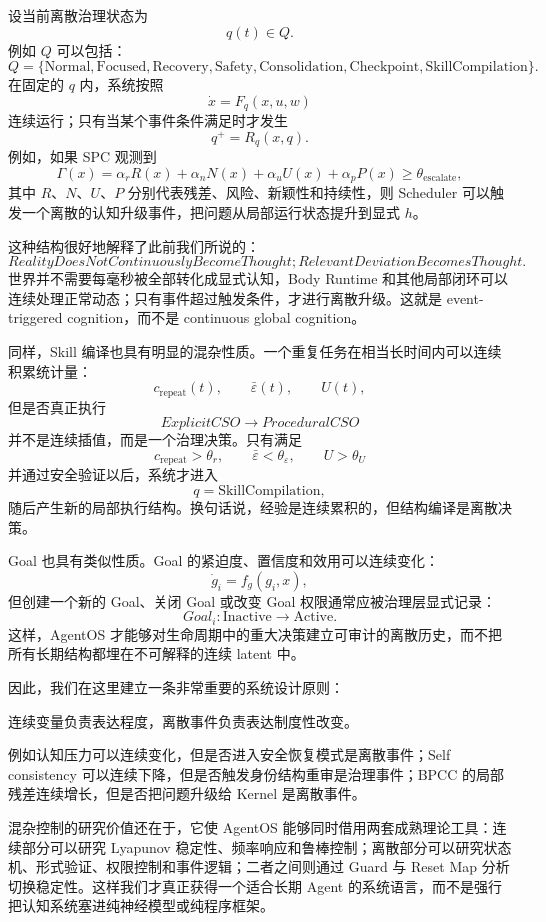 设当前离散治理状态为
\[
q(t)\in Q.
\]
例如 $Q$ 可以包括：
\[
Q=
\{
\text{Normal},
\text{Focused},
\text{Recovery},
\text{Safety},
\text{Consolidation},
\text{Checkpoint},
\text{SkillCompilation}
\}.
\]
在固定的 $q$ 内，系统按照
\[
\dot{x}
=
F_q(x,u,w)
\]
连续运行；只有当某个事件条件满足时才发生
\[
q^+
=
R_q(x,q).
\]
例如，如果 SPC 观测到
\[
\Gamma(x)
=
\alpha_rR(x)
+
\alpha_nN(x)
+
\alpha_uU(x)
+
\alpha_pP(x)
\geq
\theta_{\mathrm{escalate}},
\]
其中 $R$、$N$、$U$、$P$ 分别代表残差、风险、新颖性和持续性，则 Scheduler 可以触发一个离散的认知升级事件，把问题从局部运行状态提升到显式 $h$。

这种结构很好地解释了此前我们所说的：
\[
\boxed{
RealityDoesNotContinuouslyBecomeThought;
RelevantDeviationBecomesThought.
}
\]
世界并不需要每毫秒被全部转化成显式认知，Body Runtime 和其他局部闭环可以连续处理正常动态；只有事件超过触发条件，才进行离散升级。这就是 event-triggered cognition，而不是 continuous global cognition。

同样，Skill 编译也具有明显的混杂性质。一个重复任务在相当长时间内可以连续积累统计量：
\[
c_{\mathrm{repeat}}(t),
\qquad
\bar{\varepsilon}(t),
\qquad
U(t),
\]
但是否真正执行
\[
ExplicitCSO
\longrightarrow
ProceduralCSO
\]
并不是连续插值，而是一个治理决策。只有满足
\[
c_{\mathrm{repeat}}>\theta_r,
\qquad
\bar{\varepsilon}<\theta_\varepsilon,
\qquad
U>\theta_U
\]
并通过安全验证以后，系统才进入
\[
q=\text{SkillCompilation},
\]
随后产生新的局部执行结构。换句话说，经验是连续累积的，但结构编译是离散决策。

Goal 也具有类似性质。Goal 的紧迫度、置信度和效用可以连续变化：
\[
\dot g_i=f_g(g_i,x),
\]
但创建一个新的 Goal、关闭 Goal 或改变 Goal 权限通常应被治理层显式记录：
\[
Goal_i:\mathrm{Inactive}\rightarrow\mathrm{Active}.
\]
这样，AgentOS 才能够对生命周期中的重大决策建立可审计的离散历史，而不把所有长期结构都埋在不可解释的连续 latent 中。

因此，我们在这里建立一条非常重要的系统设计原则：
\begin{proposition*}
连续变量负责表达程度，离散事件负责表达制度性改变。
\end{proposition*}
例如认知压力可以连续变化，但是否进入安全恢复模式是离散事件；Self consistency 可以连续下降，但是否触发身份结构重审是治理事件；BPCC 的局部残差连续增长，但是否把问题升级给 Kernel 是离散事件。

混杂控制的研究价值还在于，它使 AgentOS 能够同时借用两套成熟理论工具：连续部分可以研究 Lyapunov 稳定性、频率响应和鲁棒控制；离散部分可以研究状态机、形式验证、权限控制和事件逻辑；二者之间则通过 Guard 与 Reset Map 分析切换稳定性。这样我们才真正获得一个适合长期 Agent 的系统语言，而不是强行把认知系统塞进纯神经模型或纯程序框架。


